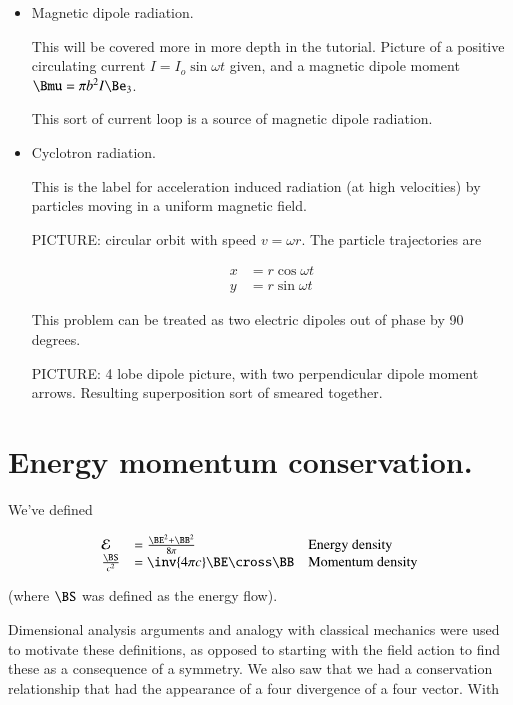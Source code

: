 \begin{itemize}
\item Magnetic dipole radiation.

This will be covered more in more depth in the tutorial.  Picture of a positive circulating current $I = I_o \sin \omega t$ given, and a magnetic dipole moment $\Bmu = \pi b^2 I \Be_3$.

This sort of current loop is a source of magnetic dipole radiation.

\item Cyclotron radiation.

This is the label for acceleration induced radiation (at high velocities) by particles moving in a uniform magnetic field.

PICTURE: circular orbit with speed $v = \omega r$.  The particle trajectories are

\begin{align}\label{eqn:relativisticElectrodynamicsL21:300}
x &= r \cos \omega t \\
y &= r \sin \omega t
\end{align}

This problem can be treated as two electric dipoles out of phase by 90 degrees.

PICTURE: 4 lobe dipole picture, with two perpendicular dipole moment arrows.  Resulting superposition sort of smeared together.

\end{itemize}

\section{Energy momentum conservation.}

We've defined

\begin{equation}\label{eqn:relativisticElectrodynamicsL21:320}
\begin{array}{l l l}
\mathcal{E} &= \frac{\BE^2 + \BB^2}{8\pi} & \mbox{Energy density} \\
\frac{\BS}{c^2} &= \inv{4 \pi c} \BE \cross \BB & \mbox{Momentum density}
\end{array}
\end{equation}

(where $\BS$ was defined as the energy flow).

Dimensional analysis arguments and analogy with classical mechanics were used to motivate these definitions, as opposed to starting with the field action to find these as a consequence of a symmetry.  We also saw that we had a conservation relationship that had the appearance of a four divergence of a four vector.  With

